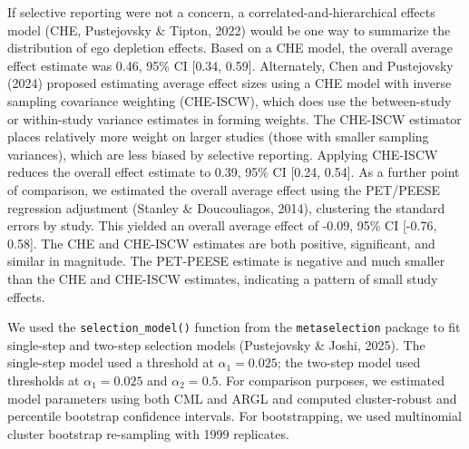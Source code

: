 \documentclass[
  man, donotrepeattitle,floatsintext]{apa7}
\begin{document}
If selective reporting were not a concern, a correlated-and-hierarchical effects model (CHE, Pustejovsky \& Tipton, 2022) would be one way to summarize the distribution of ego depletion effects.
Based on a CHE model, the overall average effect estimate was 0.46, 95\% CI {[}0.34, 0.59{]}.
Alternately, Chen and Pustejovsky (2024) proposed estimating average effect sizes using a CHE model with inverse sampling covariance weighting (CHE-ISCW), which does use the between-study or within-study variance estimates in forming weights. The CHE-ISCW estimator places relatively more weight on larger studies (those with smaller sampling variances), which are less biased by selective reporting.
Applying CHE-ISCW reduces the overall effect estimate to 0.39, 95\% CI {[}0.24, 0.54{]}.
As a further point of comparison, we estimated the overall average effect using the PET/PEESE regression adjustment (Stanley \& Doucouliagos, 2014), clustering the standard errors by study. This yielded an overall average effect of -0.09, 95\% CI {[}-0.76, 0.58{]}. The CHE and CHE-ISCW estimates are both positive, significant, and similar in magnitude. The PET-PEESE estimate is negative and much smaller than the CHE and CHE-ISCW estimates, indicating a pattern of small study effects.

We used the \texttt{selection\_model()} function from the \texttt{metaselection} package to fit single-step and two-step selection models (Pustejovsky \& Joshi, 2025).
The single-step model used a threshold at \(\alpha_1 = 0.025\); the two-step model used thresholds at \(\alpha_1 = 0.025\) and \(\alpha_2 = 0.5\).
For comparison purposes, we estimated model parameters using both CML and ARGL and computed cluster-robust and percentile bootstrap confidence intervals.
For bootstrapping, we used multinomial cluster bootstrap re-sampling with 1999 replicates.
\end{document}
